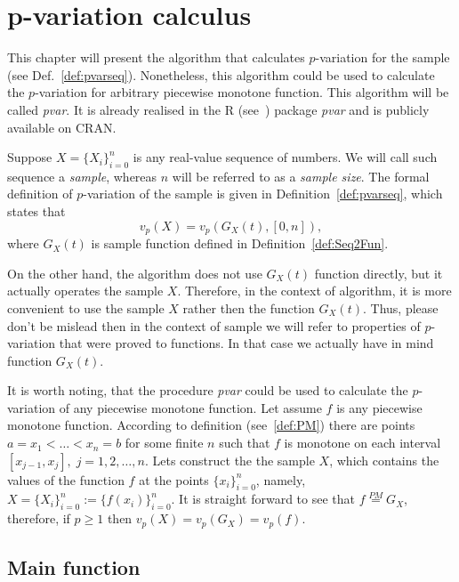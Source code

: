 \documentclass[12pt, a4paper]{article}
\numberwithin{equation}{section}
\begin{document}
\section{p-variation calculus}  
  
This chapter will present the algorithm that calculates 
$p$-variation for the sample 
(see Def.~\ref{def:pvarseq}).
Nonetheless, this algorithm could be used to calculate
the $p$-variation for arbitrary piecewise monotone function. 
This algorithm will be called \emph{pvar}. 
It is already realised in the R (see~\cite{R}) package \emph{pvar} and
is publicly available on CRAN\footnotemark.

Suppose $X=\{X_{i}\}_{i=0}^{n}$ is any real-value sequence of numbers. 
We will call such sequence a \emph{sample}, 
whereas $n$ will be referred to as a \emph{sample size}.
The formal definition of $p$-variation 
of the sample is given in Definition~\ref{def:pvarseq}, 
which states that
\begin{equation}
  v_p(X) = v_p(G_X(t),[0,n]),
\end{equation}
where $G_X(t)$ is sample function defined in  
Definition~\ref{def:Seq2Fun}.

On the other hand, the algorithm does not use
$G_X(t)$ function directly, but it actually operates the
sample $X$. Therefore, in the context of algorithm,
it is more convenient to use the sample $X$ 
rather then the function $G_X(t)$. 
Thus, please don't be mislead then
in the context of sample we will 
refer to properties of $p$-variation 
that were proved to functions. 
In that case we actually have in mind function $G_X(t)$. 





It is worth noting, 
that the procedure \emph{pvar} could be used to calculate
the $p$-variation of any piecewise monotone function.
Let assume $f$ is any piecewise monotone function.  
According to definition (see~\ref{def:PM}) 
there are points $a=x_1<\dots<x_n=b$ for some finite $n$ such 
that $f$ is monotone on each interval $[x_{j-1},x_j],\;j=1,2,\dots,n$.
Lets construct the the sample $X$, 
which contains the values of the function $f$ 
at the points $\{x_{i}\}_{i=0}^{n}$, namely,
$X=\{X_{i}\}_{i=0}^{n}:=\{f(x_{i})\}_{i=0}^{n}$.
It is straight forward to see that 
$f \stackrel{PM}{=} G_X$, therefore, if $p \geq 1$ then $v_p(X)=v_p(G_X)=v_p(f)$.


\subsection{Main function}
\end{document}
